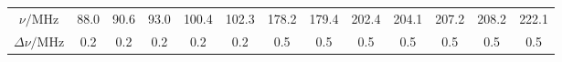 \begin{tabular}{c|*{12}{c}}
  $\nu/\si{\MHz}$ & 88.0 & 90.6 & 93.0 & 100.4 & 102.3 & 178.2 & 179.4 & 202.4 & 204.1 & 207.2 & 208.2 & 222.1 \\
  $\Delta\nu/\si{\MHz}$ & 0.2 & 0.2 & 0.2 & 0.2 & 0.2 & 0.5 & 0.5 & 0.5 & 0.5 & 0.5 & 0.5 & 0.5 \\
\end{tabular}